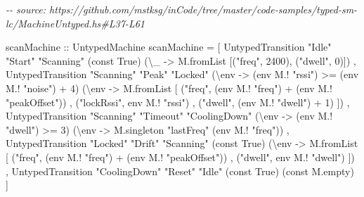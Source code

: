 \documentclass[]{article}
\newenvironment{Shaded}{}{}
\newcommand{\CommentTok}[1]{\textcolor[rgb]{0.38,0.63,0.69}{\textit{#1}}}
\newcommand{\DataTypeTok}[1]{\textcolor[rgb]{0.56,0.13,0.00}{#1}}
\newcommand{\DecValTok}[1]{\textcolor[rgb]{0.25,0.63,0.44}{#1}}
\newcommand{\FunctionTok}[1]{\textcolor[rgb]{0.02,0.16,0.49}{#1}}
\newcommand{\NormalTok}[1]{#1}
\newcommand{\OperatorTok}[1]{\textcolor[rgb]{0.40,0.40,0.40}{#1}}
\newcommand{\OtherTok}[1]{\textcolor[rgb]{0.00,0.44,0.13}{#1}}
\newcommand{\StringTok}[1]{\textcolor[rgb]{0.25,0.44,0.63}{#1}}
\begin{document}
\begin{Shaded}
\begin{Highlighting}[]
\CommentTok{{-}{-} source: https://github.com/mstksg/inCode/tree/master/code{-}samples/typed{-}sm{-}lc/MachineUntyped.hs\#L37{-}L61}

\OtherTok{scanMachine ::} \DataTypeTok{UntypedMachine}
\NormalTok{scanMachine }\OtherTok{=}
\NormalTok{  [ }\DataTypeTok{UntypedTransition} \StringTok{"Idle"} \StringTok{"Start"} \StringTok{"Scanning"}
\NormalTok{      (}\FunctionTok{const} \DataTypeTok{True}\NormalTok{)}
\NormalTok{      (\textbackslash{}\_ }\OtherTok{{-}\textgreater{}}\NormalTok{ M.fromList [(}\StringTok{"freq"}\NormalTok{, }\DecValTok{2400}\NormalTok{), (}\StringTok{"dwell"}\NormalTok{, }\DecValTok{0}\NormalTok{)])}
\NormalTok{  , }\DataTypeTok{UntypedTransition} \StringTok{"Scanning"} \StringTok{"Peak"} \StringTok{"Locked"}
\NormalTok{      (\textbackslash{}env }\OtherTok{{-}\textgreater{}}\NormalTok{ (env }\OperatorTok{M.!} \StringTok{"rssi"}\NormalTok{) }\OperatorTok{\textgreater{}=}\NormalTok{ (env }\OperatorTok{M.!} \StringTok{"noise"}\NormalTok{) }\OperatorTok{+} \DecValTok{4}\NormalTok{)}
\NormalTok{      (\textbackslash{}env }\OtherTok{{-}\textgreater{}}\NormalTok{ M.fromList}
\NormalTok{        [ (}\StringTok{"freq"}\NormalTok{, (env }\OperatorTok{M.!} \StringTok{"freq"}\NormalTok{) }\OperatorTok{+}\NormalTok{ (env }\OperatorTok{M.!} \StringTok{"peakOffset"}\NormalTok{))}
\NormalTok{        , (}\StringTok{"lockRssi"}\NormalTok{, env }\OperatorTok{M.!} \StringTok{"rssi"}\NormalTok{)}
\NormalTok{        , (}\StringTok{"dwell"}\NormalTok{, (env }\OperatorTok{M.!} \StringTok{"dwell"}\NormalTok{) }\OperatorTok{+} \DecValTok{1}\NormalTok{)}
\NormalTok{        ])}
\NormalTok{  , }\DataTypeTok{UntypedTransition} \StringTok{"Scanning"} \StringTok{"Timeout"} \StringTok{"CoolingDown"}
\NormalTok{      (\textbackslash{}env }\OtherTok{{-}\textgreater{}}\NormalTok{ (env }\OperatorTok{M.!} \StringTok{"dwell"}\NormalTok{) }\OperatorTok{\textgreater{}=} \DecValTok{3}\NormalTok{)}
\NormalTok{      (\textbackslash{}env }\OtherTok{{-}\textgreater{}}\NormalTok{ M.singleton }\StringTok{"lastFreq"}\NormalTok{ (env }\OperatorTok{M.!} \StringTok{"freq"}\NormalTok{))}
\NormalTok{  , }\DataTypeTok{UntypedTransition} \StringTok{"Locked"} \StringTok{"Drift"} \StringTok{"Scanning"}
\NormalTok{      (}\FunctionTok{const} \DataTypeTok{True}\NormalTok{)}
\NormalTok{      (\textbackslash{}env }\OtherTok{{-}\textgreater{}}\NormalTok{ M.fromList}
\NormalTok{        [ (}\StringTok{"freq"}\NormalTok{, (env }\OperatorTok{M.!} \StringTok{"freq"}\NormalTok{) }\OperatorTok{+}\NormalTok{ (env }\OperatorTok{M.!} \StringTok{"peakOffset"}\NormalTok{))}
\NormalTok{        , (}\StringTok{"dwell"}\NormalTok{, env }\OperatorTok{M.!} \StringTok{"dwell"}\NormalTok{)}
\NormalTok{        ])}
\NormalTok{  , }\DataTypeTok{UntypedTransition} \StringTok{"CoolingDown"} \StringTok{"Reset"} \StringTok{"Idle"}
\NormalTok{      (}\FunctionTok{const} \DataTypeTok{True}\NormalTok{)}
\NormalTok{      (}\FunctionTok{const}\NormalTok{ M.empty)}
\NormalTok{  ]}
\end{Highlighting}
\end{Shaded}
\end{document}

